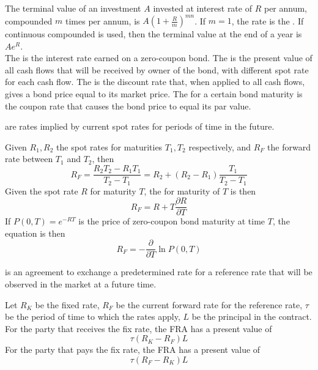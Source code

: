 The terminal value of an investment $A$ invested at interest rate of $R$ per annum, compounded $m$ times per annum, is $A(1+\frac{R}{m})^{mn}$. If $m=1$, the rate is the . If continuous compounded is used, then  the terminal value at the end of a year is $Ae^{R}$.\\

The  is the interest rate earned on a zero-coupon bond. The  is the present value of all cash flows that will be received by owner of the bond, with different spot rate for each cash flow. The  is the discount rate that, when applied to all cash flows, gives a bond price equal to its market price. The  for a certain bond maturity is the coupon rate that causes the bond price to equal its par value.\\

\begin{definition}
 are rates implied by current spot rates for periods of time in the future.
\end{definition}

Given $R_1, R_2$ the spot rates for maturities $T_1, T_2$ respectively, and $R_F$ the forward rate between $T_1$ and $T_2$, then
\begin{equation}
R_F = \frac{R_2 T_2 - R_1 T_1}{T_2 - T_1}=R_2 + (R_2 - R_1)\frac{T_1}{T_2 - T_1} \nonumber
\end{equation}
Given the spot rate $R$ for maturity $T$, the  for maturity of $T$ is then
\begin{equation}
R_F = R + T \frac{\partial R}{\partial T} \nonumber
\end{equation}
If $P(0,T) = e^{-RT}$ is the price of zero-coupon bond maturity at time $T$, the equation is then
\begin{equation}
R_F = -\frac{\partial}{\partial T} \ln P(0,T) \nonumber
\end{equation}

\begin{definition}
 is an agreement to exchange a predetermined rate for a reference rate that will be observed in the market at a future time.
\end{definition}

Let $R_K$ be the fixed rate, $R_F$ be the current forward rate for the reference rate, $\tau$ be the period of time to which the rates apply, $L$ be the principal in the contract.\\
For the party that receives the fix rate, the FRA has a present value of 
\begin{equation}
\tau (R_K - R_F)L \nonumber
\end{equation}
For the party that pays the fix rate, the FRA has a present value of
\begin{equation}
\tau (R_F - R_K)L \nonumber
\end{equation}


